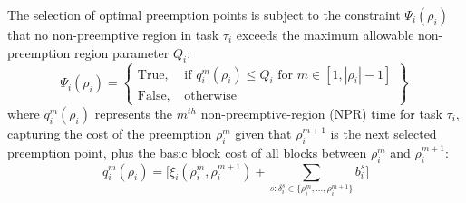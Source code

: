 %
\noindent
The selection of optimal preemption points is subject to the constraint \begin{math}\Psi_{i}(\rho_{i})\end{math} that no non-preemptive region in task \begin{math}\tau_{i}\end{math} exceeds the maximum allowable non-preemption region parameter \begin{math}Q_{i}\end{math}:
\begin{equation}\label{eqn:global-pp-constraint}
   \Psi_{i}(\rho_{i}) =
\left\{
\begin{array}{lr}
    \textrm{True, }&\textrm{if } q_{i}^{m}(\rho_{i}) \leq Q_{i} \textrm{ for } m \in [1,|\rho_{i}|-1] \\
    \textrm{False, }&\textrm{otherwise}
\end{array}
\right\}~
\end{equation}
%
\noindent
where \begin{math}q_{i}^{m}(\rho_{i})\end{math} represents the \begin{math}m^{th}\end{math} non-preemptive-region (NPR) time for task \begin{math}\tau_{i}\end{math}, capturing the cost of the preemption $\rho_i^m$ given that $\rho_i^{m+1}$ is the next selected preemption point, plus the basic block cost of all blocks between $\rho_i^m$ and $\rho_i^{m+1}$:
\begin{equation}\label{eqn:global-mthnpr-time}
   q_{i}^{m}(\rho_{i}) = \Big[\xi_{i}(\rho_{i}^{m},\rho_{i}^{m+1}) +
   \sum_{s: \delta_i^s \in \{\rho_i^m,\ldots, \rho_i^{m+1}\}} b_{i}^{s}\Big]
\end{equation}
\noindent
